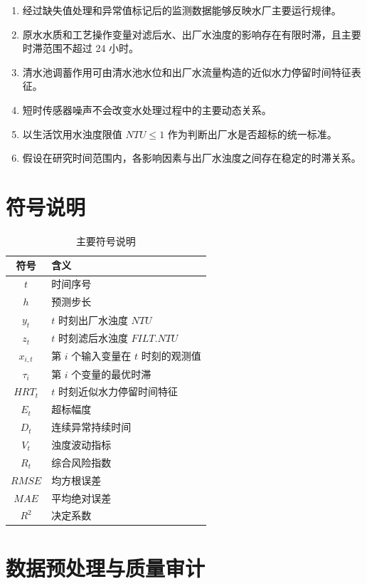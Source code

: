 \documentclass[UTF8,zihao=-4]{ctexart}
\begin{document}
\begin{enumerate}[label=假设\arabic*：]
  \item 经过缺失值处理和异常值标记后的监测数据能够反映水厂主要运行规律。
  \item 原水水质和工艺操作变量对滤后水、出厂水浊度的影响存在有限时滞，且主要时滞范围不超过 24 小时。
  \item 清水池调蓄作用可由清水池水位和出厂水流量构造的近似水力停留时间特征表征。
  \item 短时传感器噪声不会改变水处理过程中的主要动态关系。
  \item 以生活饮用水浊度限值 $NTU\leq 1$ 作为判断出厂水是否超标的统一标准。
  \item 假设在研究时间范围内，各影响因素与出厂水浊度之间存在稳定的时滞关系。
\end{enumerate}

\section{符号说明}

\begin{table}[H]
\centering
\caption{主要符号说明}
\begin{tabular}{cl}
\toprule
符号 & 含义 \\
\midrule
$t$ & 时间序号 \\
$h$ & 预测步长 \\
$y_t$ & $t$ 时刻出厂水浊度 $NTU$ \\
$z_t$ & $t$ 时刻滤后水浊度 $FILT.NTU$ \\
$x_{i,t}$ & 第 $i$ 个输入变量在 $t$ 时刻的观测值 \\
$\tau_i$ & 第 $i$ 个变量的最优时滞 \\
$HRT_t$ & $t$ 时刻近似水力停留时间特征 \\
$E_t$ & 超标幅度 \\
$D_t$ & 连续异常持续时间 \\
$V_t$ & 浊度波动指标 \\
$R_t$ & 综合风险指数 \\
$RMSE$ & 均方根误差 \\
$MAE$ & 平均绝对误差 \\
$R^2$ & 决定系数 \\
\bottomrule
\end{tabular}
\end{table}

\section{数据预处理与质量审计}
\end{document}

